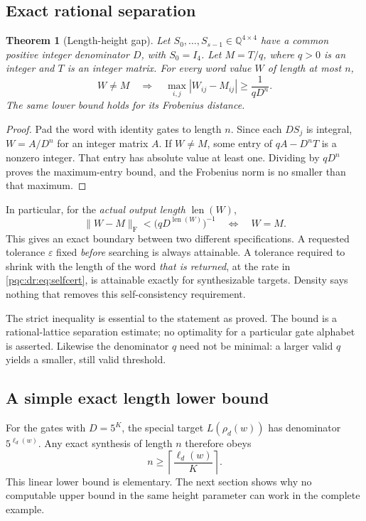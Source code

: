 \documentclass[11pt,letterpaper]{article}
\numberwithin{equation}{section}
\newtheorem{theorem}{Theorem}[section]
\theoremstyle{definition}
\theoremstyle{remark}
\newcommand{\Q}{\mathbb Q}
\newcommand{\len}{\operatorname{len}}
\newcommand{\Frob}[1]{\lVert #1\rVert_{\mathrm F}}
\begin{document}
\subsection{Exact rational separation}
\begin{theorem}[Length-height gap]
\label{pqc:dr:thm:gap}
Let $S_0,\ldots,S_{s-1}\in\Q^{4\times4}$ have a common positive
integer denominator $D$, with $S_0=I_4$. Let $M=T/q$, where $q>0$ is
an integer and $T$ is an integer matrix. For every word value $W$ of
length at most $n$,
\begin{equation}
 W\ne M\quad\Longrightarrow\quad
 \max_{i,j}|W_{ij}-M_{ij}|\geq\frac1{qD^n}.
 \label{pqc:dr:eq:gap}
\end{equation}
The same lower bound holds for its Frobenius distance.
\end{theorem}
\begin{proof}
Pad the word with identity gates to length $n$. Since each $DS_j$
is integral, $W=A/D^n$ for an integer matrix $A$. If $W\ne M$,
some entry of $qA-D^nT$ is a nonzero integer. That entry has absolute
value at least one. Dividing by $qD^n$ proves the maximum-entry bound,
and the Frobenius norm is no smaller than that maximum.
\end{proof}

In particular, for the \emph{actual output length} $\len(W)$,
\begin{equation}
 \Frob{W-M}<\bigl(qD^{\len(W)}\bigr)^{-1}
 \quad\Longleftrightarrow\quad W=M.
 \label{pqc:dr:eq:selfcert}
\end{equation}
This gives an exact boundary between two different specifications.
A requested tolerance $\varepsilon$ fixed \emph{before} searching is
always attainable. A tolerance required to shrink with the length of
the word \emph{that is returned}, at the rate in \eqref{pqc:dr:eq:selfcert},
is attainable exactly for synthesizable targets. Density says nothing
that removes this self-consistency requirement.

The strict inequality is essential to the statement as proved. The
bound is a rational-lattice separation estimate; no optimality for a
particular gate alphabet is asserted. Likewise the denominator $q$ need
not be minimal: a larger valid $q$ yields a smaller, still valid threshold.

\subsection{A simple exact length lower bound}
For the gates with $D=5^K$, the special target
$L(\rho_d(w))$ has denominator $5^{\ell_d(w)}$. Any exact synthesis
of length $n$ therefore obeys
\begin{equation}
 n\geq\left\lceil\frac{\ell_d(w)}K\right\rceil.
 \label{pqc:dr:eq:elementarylower}
\end{equation}
This linear lower bound is elementary. The next section shows why no
computable upper bound in the same height parameter can work in the
complete example.
\end{document}
